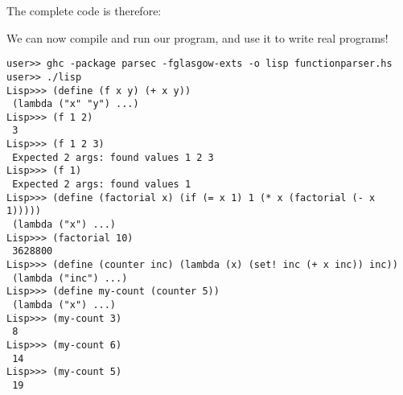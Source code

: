 The complete code is therefore:
 
 
We can now compile and run our program, and use it to write real programs!
 
\begin{lstlisting}[language=shell,numbers=none,nolol]
user>> ghc -package parsec -fglasgow-exts -o lisp functionparser.hs
user>> ./lisp
Lisp>>> (define (f x y) (+ x y))
 (lambda ("x" "y") ...)
Lisp>>> (f 1 2)
 3
Lisp>>> (f 1 2 3)
 Expected 2 args: found values 1 2 3
Lisp>>> (f 1)
 Expected 2 args: found values 1
Lisp>>> (define (factorial x) (if (= x 1) 1 (* x (factorial (- x 1)))))
 (lambda ("x") ...)
Lisp>>> (factorial 10)
 3628800
Lisp>>> (define (counter inc) (lambda (x) (set! inc (+ x inc)) inc))
 (lambda ("inc") ...)
Lisp>>> (define my-count (counter 5))
 (lambda ("x") ...)
Lisp>>> (my-count 3)
 8
Lisp>>> (my-count 6)
 14
Lisp>>> (my-count 5)
 19
\end{lstlisting}
